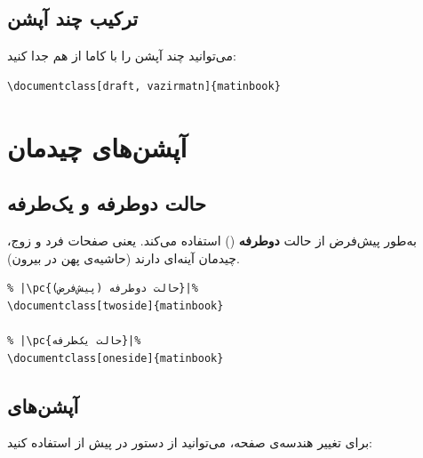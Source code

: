 
\subsection{ترکیب چند آپشن}
\label{sec:options-combine}

می‌توانید چند آپشن را با کاما از هم جدا کنید:

\begin{latin}
\begin{verbatim}
\documentclass[draft, vazirmatn]{matinbook}
\end{verbatim}
\end{latin}


\section{آپشن‌های چیدمان}
\label{sec:options-layout}

\subsection{حالت دوطرفه و یک‌طرفه}
\label{sec:options-twoside}

 به‌طور پیش‌فرض از حالت
\textbf{دوطرفه} () استفاده
می‌کند. یعنی صفحات فرد و زوج، چیدمان
آینه‌ای دارند (حاشیه‌ی پهن در بیرون).

\begin{latin}
\begin{verbatim}
% |\pc{حالت دوطرفه (پیش‌فرض)}|%
\documentclass[twoside]{matinbook}

% |\pc{حالت یک‌طرفه}|%
\documentclass[oneside]{matinbook}
\end{verbatim}
\end{latin}


\subsection{آپشن‌های }
\label{sec:options-geometry}

برای تغییر هندسه‌ی صفحه، می‌توانید از
دستور  در پیش از
 استفاده کنید:

